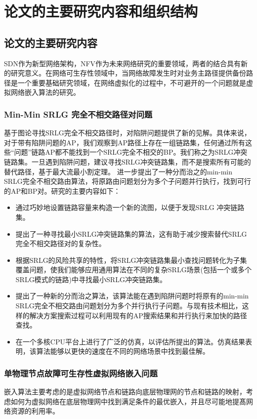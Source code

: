\section{论文的主要研究内容和组织结构}
\subsection{论文的主要研究内容}
SDN作为新型网络架构，NFV作为未来网络研究的重要领域，两者的结合具有新的研究意义。在网络可生存性领域中，当网络故障发生时对业务主路径提供备份路径是一个重要基础研究领域，在网络虚拟化的过程中，不可避开的一个问题就是虚拟网络嵌入算法的研究。
\subsubsection{Min-Min SRLG 完全不相交路径对问题}
基于图论寻找SRLG完全不相交路径时，对陷阱问题提供了新的见解。具体来说，对于带有陷阱问题的AP，我们观察到AP路径上存在一组链路集，任何通过所有这些“问题”链路AP都不能找到一个SRLG完全不相交的BP。我们称之为SRLG冲突链路集。一旦遇到陷阱问题，建议寻找SRLG冲突链路集，而不是搜索所有可能的替代路径，基于最大流最小割定理\cite{ford2015flows}。 进一步提出了一种分而治之的min-min SRLG完全不相交路由算法，将原路由问题划分为多个子问题并行执行，找到可行的AP和BP对。研究的主要内容如下：
\begin{itemize}
  \item 通过巧妙地设置链路容量来构造一个新的流图，以便于发现SRLG 冲突链路集。
  \item 提出了一种寻找最小SRLG冲突链路集的算法，这有助于减少搜索替代SRLG完全不相交路径对的复杂性。
  \item 根据SRLG的风险共享的特性，将SRLG冲突链路集最小查找问题转化为子集覆盖问题，使我们能够应用通用算法在不同的复杂SRLG场景(包括一个或多个SRLG模式的链路)中寻找最小SRLG冲突链路集。
  \item 提出了一种新的分而治之算法，该算法能在遇到陷阱问题时将原有的min-min SRLG完全不相交路由问题划分为多个并行执行子问题。与现有技术相比，这样的解决方案搜索过程可以利用现有的AP搜索结果和并行执行来加快的路径查找。
  \item 在一个多核CPU平台上进行了广泛的仿真，以评估所提出的算法。仿真结果表明，该算法能够以更快的速度在不同的网络场景中找到最佳解。
\end{itemize}

\subsubsection{单物理节点故障可生存性虚拟网络嵌入问题}
嵌入算法主要考虑的是虚拟网络节点和链路向底层物理网的节点和链路的映射，考虑如何为虚拟网络在底层物理网中找到满足条件的最优嵌入，并且尽可能地提髙网络资源的利用率。%

